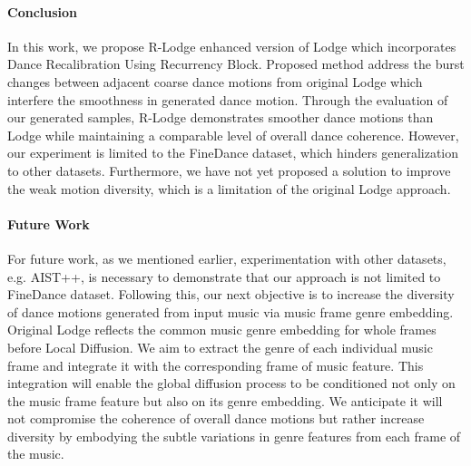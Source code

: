 \paragraph{Conclusion} In this work, we propose R-Lodge enhanced version of Lodge which incorporates Dance Recalibration Using Recurrency Block. Proposed method address the burst changes between adjacent coarse dance motions from original Lodge which interfere the smoothness in generated dance motion. Through the evaluation of our generated samples, R-Lodge demonstrates smoother dance motions than Lodge while maintaining a comparable level of overall dance coherence. However, our experiment is limited to the FineDance dataset\cite{li2023finedance}, which hinders generalization to other datasets. Furthermore, we have not yet proposed a solution to improve the weak motion diversity, which is a limitation of the original Lodge approach.
\paragraph{Future Work} For future work, as we mentioned earlier, experimentation with other datasets, e.g. AIST++\cite{li2021ai}, is necessary to demonstrate that our approach is not limited to FineDance\cite{li2023finedance} dataset. Following this, our next objective is to increase the diversity of dance motions generated from input music via music frame genre embedding. Original Lodge reflects the common music genre embedding for whole frames before Local Diffusion. We aim to extract the genre of each individual music frame and integrate it with the corresponding frame of music feature. This integration will enable the global diffusion process to be conditioned not only on the music frame feature but also on its genre embedding. We anticipate it will not compromise the coherence of overall dance motions but rather increase diversity by embodying the subtle variations in genre features from each frame of the music.
